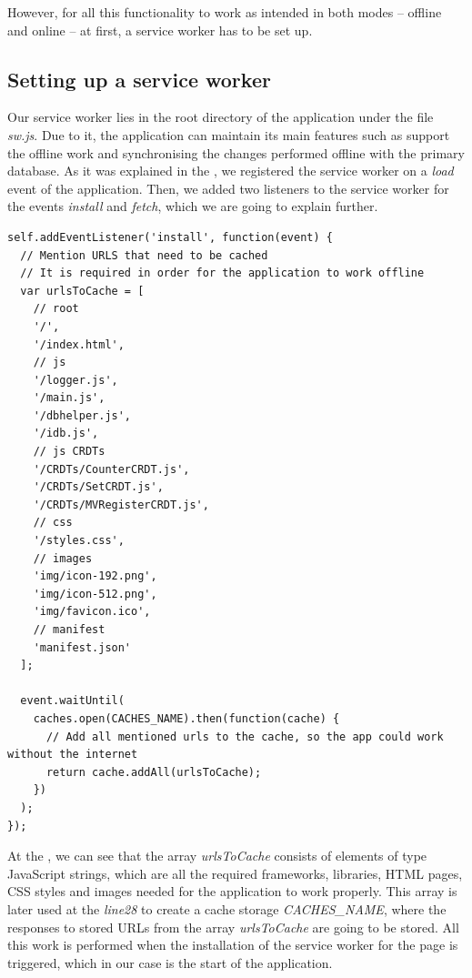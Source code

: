 However, for all this functionality to work as intended in both modes -- offline and online -- at first, a service worker has to be set up. 

\subsection*{Setting up a service worker}

Our service worker lies in the root directory of the application under the file \textit{sw.js}. Due to it, the application can maintain its main features such as support the offline work and synchronising the changes performed offline with the primary database. As it was explained in the , we registered the service worker on a \textit{load} event of the application. Then, we added two listeners to the service worker for the events \textit{install} and \textit{fetch}, which we are going to explain further.

\begin{lstlisting}[caption={Code for caching necessary data for the client.}, label={lst:dev4}]
self.addEventListener('install', function(event) {
  // Mention URLS that need to be cached
  // It is required in order for the application to work offline
  var urlsToCache = [
    // root
    '/',
    '/index.html',
    // js
    '/logger.js',
    '/main.js',
    '/dbhelper.js',
    '/idb.js',
    // js CRDTs
    '/CRDTs/CounterCRDT.js',
    '/CRDTs/SetCRDT.js',
    '/CRDTs/MVRegisterCRDT.js',
    // css
    '/styles.css',
    // images
    'img/icon-192.png',
    'img/icon-512.png',
    'img/favicon.ico',
    // manifest
    'manifest.json'
  ];

  event.waitUntil(
    caches.open(CACHES_NAME).then(function(cache) {
      // Add all mentioned urls to the cache, so the app could work without the internet
      return cache.addAll(urlsToCache);
    })
  );
});
\end{lstlisting}

At the , we can see that the array \textit{urlsToCache} consists of elements of type JavaScript strings, which are all the required frameworks, libraries, HTML pages, CSS styles and images needed for the application to work properly. This array is later used at the \textit{line28} to create a cache storage \textit{CACHES\_NAME}, where the responses to stored URLs from the array \textit{urlsToCache} are going to be stored. All this work is performed when the installation of the service worker for the page is triggered, which in our case is the start of the application. 

